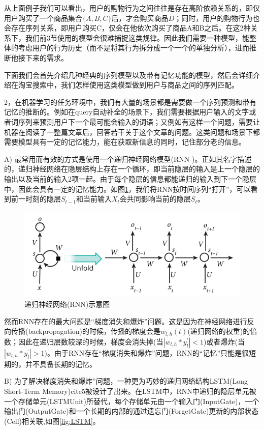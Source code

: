从上面例子我们可以看出，用户的购物行为之间往往是存在高阶依赖关系的，即仅用户购买了一个商品集合$\{A, B, C\}$后，才会购买商品$D$；同时，用户的购物行为也会存在序列关系，即用户购买C，仅会在他依次购买了商品A和B之后。在这2种关系下，我们前3节使用的模型会很难捕捉这类规律。因此我们需要一种模型，能整体的考虑用户的行为历史（而不是将其行为拆分成一个一个的单独分析），进而推断他接下来的需求。

下面我们会首先介绍几种经典的序列模型以及带有记忆功能的模型，然后会详细介绍在淘宝搜索中，我们怎样使用这类模型做到用户与商品之间的序列匹配。

2，在机器学习的任务环境中，我们有大量的场景都是需要做一个序列预测和带有记忆的推断的。例如在query自动补全的场景下，我们需要根据用户输入的文字或者词序列来预测用户下一个最可能会输入的词语；又例如有这样一个问题，需要让机器在阅读了一整篇文章后，回答若干关于这个文章的问题。这类问题和场景下都需要模型具有一定的记忆能力，能在获取新信息的同时，记住部分老的信息。

A) 最常用而有效的方式是使用一个递归神经网络模型(RNN \cite{4,5})。正如其名字描述的，递归神经网络在隐层结构上存在一个循环，即当前隐层的输入是上一个隐层的输出以及当前的输入2项一起。由于每个隐层的信息都能递归的输入到下一个隐层中，因此会具有一定的记忆能力。如图\ref{fig:RNN}，我们将RNN按时间序列“打开”，可以看到前一时刻的隐层$S_{t-1}$和当前输入$X_t$会共同影响当前的隐层$S_{t}$。

\begin{figure}[h]
	\centering
	\includegraphics[width=0.8\linewidth]{"fig/RNN"}
	\caption{递归神经网络(RNN)示意图}
	\label{fig:RNN}
\end{figure}	

然而RNN存在的最大问题是“梯度消失和爆炸”问题\cite{6}。这是因为在神经网络进行反向传播(backpropagation)的时候，传播的梯度会是$w_{l,h}(t)$(递归网络的权重)的倍数；因此在递归层数较深的时候，梯度会消失掉(当$|w_{l,h}*y^{'}_{l}|<1$)或者爆炸(当$|w_{l,h}*y^{'}_{l}|>1$)。由于RNN存在“梯度消失和爆炸”问题，RNN的“记忆”只能是很短期的，并不具备长期的记忆。

B) 为了解决梯度消失和爆炸”问题，一种更为巧妙的递归网络结构LSTM(Long Short-Term Memory)cite{5}被设计了出来。在LSTM中，RNN中递归的隐层单元被一个存储单元(LSTMUnit)所替代，每个存储单元由一个输入门(InputGate)，一个输出门(OutputGate)和一个长期的内部的通过遗忘门(ForgetGate)更新的内部状态(Cell)相关联,如图\ref{fig:LSTM}。

